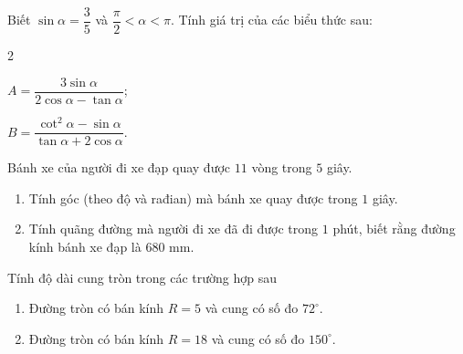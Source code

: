 \begin{baitap}%
	Biết $\sin \alpha=\dfrac{3}{5}$ và $\dfrac{\pi}{2}<\alpha<\pi$. Tính giá trị của các biểu thức sau:
	\begin{enumEX}[a)]{2}
		\item $A=\dfrac{3 \sin \alpha}{2 \cos \alpha-\tan \alpha}$;
		\item $B=\dfrac{\cot ^2 \alpha-\sin \alpha}{\tan \alpha+2 \cos \alpha}$.
	\end{enumEX}
\end{baitap}

\begin{baitap}%
	Bánh xe của người đi xe đạp quay được $11$ vòng trong $5$ giây.
	\begin{enumerate}
		\item Tính góc (theo độ và rađian) mà bánh xe quay được trong $1$ giây.
		\item Tính quãng đường mà người đi xe đã đi được trong $1$ phút, biết rằng đường kính bánh xe đạp là $680$ mm.
	\end{enumerate}
\end{baitap} 

\begin{baitap}%
	Tính độ dài cung tròn trong các trường hợp sau
	\begin{enumerate}
		\item Đường tròn có bán kính  $ R=5 $ và cung có số đo $72^\circ$.
		\item Đường tròn có bán kính  $ R=18 $ và cung có số đo  $150^\circ$.
	\end{enumerate}
\end{baitap} 


